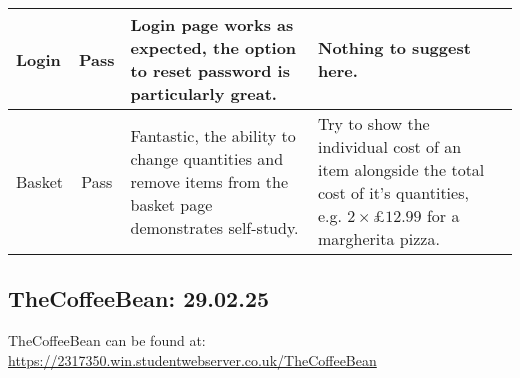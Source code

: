 \documentclass{article}
\begin{document}
\begin{adjustwidth}{-2cm}{-2cm}
\begin{center}
\begin{longtable}{|p{1.2cm}|c|p{5cm}|p{5cm}|c|}
      Login & Pass &
      Login page works as expected, the option to reset password is particularly great. &
      Nothing to suggest here. \\ \hline
           
      Basket & Pass &
      Fantastic, the ability to change quantities and remove items from the basket page demonstrates self-study. &
      Try to show the individual cost of an item alongside the total cost of it's quantities, e.g. $2 \times \pounds12.99$ for a margherita pizza. \\ \hline

    \end{longtable}
  \end{center}
\end{adjustwidth}

\subsection{TheCoffeeBean: 29.02.25}
TheCoffeeBean can be found at: \url{https://2317350.win.studentwebserver.co.uk/TheCoffeeBean}
\end{document}
